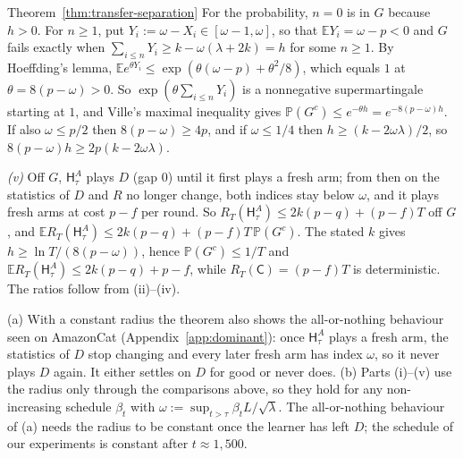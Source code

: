 \documentclass[anon]{alt2027} %
\newcommand{\Prb}{\mathbb{P}}
\newcommand{\E}{\mathbb{E}}
\newcommand{\Cold}{\mathsf{C}}
\newcommand{\Hyb}{\mathsf{H}}
\begin{document}
\begin{proofof}{Theorem~\ref{thm:transfer-separation}}
For the probability, $n=0$ is in $G$ because $h>0$. For $n\ge1$, put
$Y_i:=\omega-X_i\in[\omega-1,\omega]$, so that $\E Y_i=\omega-p<0$ and $G$ fails exactly when
$\sum_{i\le n}Y_i\ge k-\omega(\lambda+2k)=h$ for some $n\ge1$. By Hoeffding's lemma,
$\E e^{\theta Y_i}\le\exp(\theta(\omega-p)+\theta^2/8)$, which equals $1$ at
$\theta=8(p-\omega)>0$. So $\exp(\theta\sum_{i\le n}Y_i)$ is a nonnegative
supermartingale starting at $1$, and Ville's maximal inequality gives
$\Prb(G^c)\le e^{-\theta h}=e^{-8(p-\omega)h}$. If also $\omega\le p/2$ then
$8(p-\omega)\ge4p$, and if $\omega\le1/4$ then $h\ge(k-2\omega\lambda)/2$, so
$8(p-\omega)h\ge2p(k-2\omega\lambda)$.

\emph{(v)} Off $G$, $\Hyb^A_\tau$ plays $D$ (gap $0$) until it first plays a
fresh arm; from then on the statistics of $D$ and $R$ no longer change, both
indices stay below $\omega$, and it plays fresh arms at cost $p-f$ per round.
So $R_T(\Hyb^A_\tau)\le2k(p-q)+(p-f)T$ off $G$, and
$\E R_T(\Hyb^A_\tau)\le2k(p-q)+(p-f)T\,\Prb(G^c)$. The stated $k$ gives
$h\ge\ln T/(8(p-\omega))$, hence $\Prb(G^c)\le1/T$ and
$\E R_T(\Hyb^A_\tau)\le2k(p-q)+p-f$, while $R_T(\Cold)=(p-f)T$ is
deterministic. The ratios follow from (ii)--(iv).
\end{proofof}

\begin{remark}
\label{rem:transfer-extensions}
(a) With a constant radius the theorem also shows the all-or-nothing
behaviour seen on AmazonCat (Appendix~\ref{app:dominant}): once
$\Hyb^A_\tau$ plays a fresh arm, the statistics of $D$ stop changing and every
later fresh arm has index $\omega$, so it never plays $D$ again. It either
settles on $D$ for good or never does.
(b) Parts (i)--(v) use the radius only through the comparisons above, so they
hold for any non-increasing schedule $\beta_t$ with
$\omega:=\sup_{t>\tau}\beta_tL/\sqrt\lambda$. The all-or-nothing behaviour of
(a) needs the radius to be constant once the learner has left $D$; the
schedule of our experiments is constant after $t\approx1{,}500$.
\end{remark}
\end{document}
